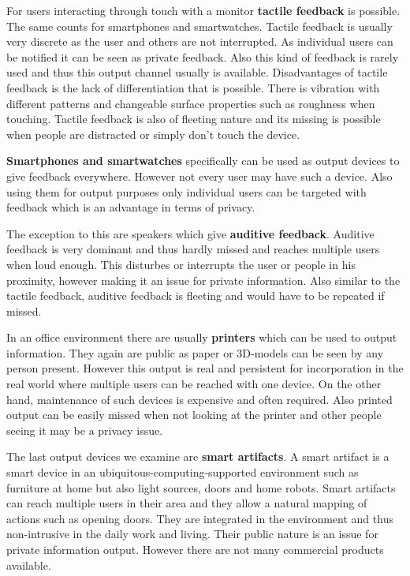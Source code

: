 For users interacting through touch with a monitor \textbf{tactile feedback} is possible.
The same counts for smartphones and smartwatches.
Tactile feedback is usually very discrete as the user and others are not interrupted.
As individual users can be notified it can be seen as private feedback.
Also this kind of feedback is rarely used and thus this output channel usually is available.
Disadvantages of tactile feedback is the lack of differentiation that is possible.
There is vibration with different patterns and changeable surface properties such as roughness when touching.
Tactile feedback is also of fleeting nature and its missing is possible when people are distracted or simply don’t touch the device.

\textbf{Smartphones and smartwatches} specifically can be used as output devices to give feedback everywhere.
However not every user may have such a device.
Also using them for output purposes only individual users can be targeted with feedback which is an advantage in terms of privacy.

The exception to this are speakers which give \textbf{auditive feedback}.
Auditive feedback is very dominant and thus hardly missed and reaches multiple users when loud enough.
This disturbes or interrupts the user or people in his proximity, however making it an issue for private information.
Also similar to the tactile feedback, auditive feedback is fleeting and would have to be repeated if missed.

In an office environment there are usually \textbf{printers} which can be used to output information.
They again are public as paper or 3D-models can be seen by any person present.
However this output is real and persistent for incorporation in the real world where multiple users can be reached with one device.
On the other hand, maintenance of such devices is expensive and often required.
Also printed output can be easily missed when not looking at the printer and other people seeing it may be a privacy issue.

The last output devices we examine are \textbf{smart artifacts}.
A smart artifact is a smart device in an ubiquitous-computing-supported environment such as furniture at home but also light sources, doors and home robots.
Smart artifacts can reach multiple users in their area and they allow a natural mapping of actions such as opening doors.
They are integrated in the environment and thus non-intrusive in the daily work and living.
Their public nature is an issue for private information output.
However there are not many commercial products available.